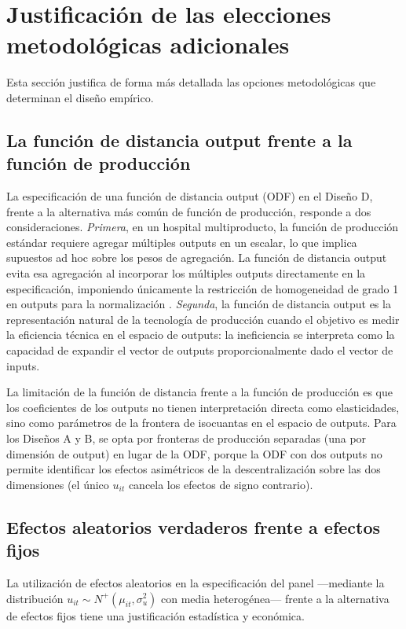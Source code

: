 \documentclass[12pt, a4paper, twoside, openright]{book}
\theoremstyle{plain}
\theoremstyle{definition}
\theoremstyle{remark}
\begin{document}
\section{Justificación de las elecciones metodológicas adicionales}
\label{sec:justificacion_adicional}

Esta sección justifica de forma más detallada las opciones metodológicas que determinan el diseño empírico.

\subsection{La función de distancia output frente a la función de producción}

La especificación de una función de distancia output (ODF) en el Diseño D, frente a la alternativa más común de función de producción, responde a dos consideraciones. \textit{Primera}, en un hospital multiproducto, la función de producción estándar requiere agregar múltiples outputs en un escalar, lo que implica supuestos ad hoc sobre los pesos de agregación. La función de distancia output evita esa agregación al incorporar los múltiples outputs directamente en la especificación, imponiendo únicamente la restricción de homogeneidad de grado 1 en outputs para la normalización \citep{coelli1999,grosskopf1987}. \textit{Segunda}, la función de distancia output es la representación natural de la tecnología de producción cuando el objetivo es medir la eficiencia técnica en el espacio de outputs: la ineficiencia se interpreta como la capacidad de expandir el vector de outputs proporcionalmente dado el vector de inputs.

La limitación de la función de distancia frente a la función de producción es que los coeficientes de los outputs no tienen interpretación directa como elasticidades, sino como parámetros de la frontera de isocuantas en el espacio de outputs. Para los Diseños A y B, se opta por fronteras de producción separadas (una por dimensión de output) en lugar de la ODF, porque la ODF con dos outputs no permite identificar los efectos asimétricos de la descentralización sobre las dos dimensiones (el único $u_{it}$ cancela los efectos de signo contrario).

\subsection{Efectos aleatorios verdaderos frente a efectos fijos}

La utilización de efectos aleatorios en la especificación del panel ---mediante la distribución $u_{it} \sim N^+(\mu_{it}, \sigma_u^2)$ con media heterogénea--- frente a la alternativa de efectos fijos tiene una justificación estadística y económica.
\end{document}

